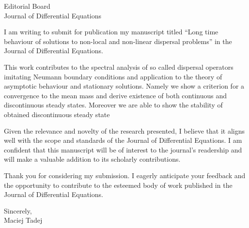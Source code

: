 \documentclass{letter}
\begin{document}
\begin{letter}{%
    Editorial Board\\
    Journal of Differential Equations\\
}

\date{\today}

\opening{}

I am writing to submit for publication my manuscript titled ``Long time behaviour of solutions to non-local and non-linear dispersal problems'' in the Journal of Differential Equations.

This work contributes to the spectral analysis of so called dispersal operators imitating Neumann boundary conditions and application to the theory of asymptotic behaviour and stationary solutions. Namely we show a criterion for a convergence to the mean mass and derive existence of both continuous and discontinuous steady states. Moreover we are able to show the stability of obtained discontinuous steady state

Given the relevance and novelty of the research presented, I believe that it aligns well with the scope and standards of the Journal of Differential Equations. I am confident that this manuscript will be of interest to the journal's readership and will make a valuable addition to its scholarly contributions.

Thank you for considering my submission. I eagerly anticipate your feedback and the opportunity to contribute to the esteemed body of work published in the Journal of Differential Equations.

\closing{Sincerely, \\ Maciej Tadej}

\end{letter}
\end{document}

